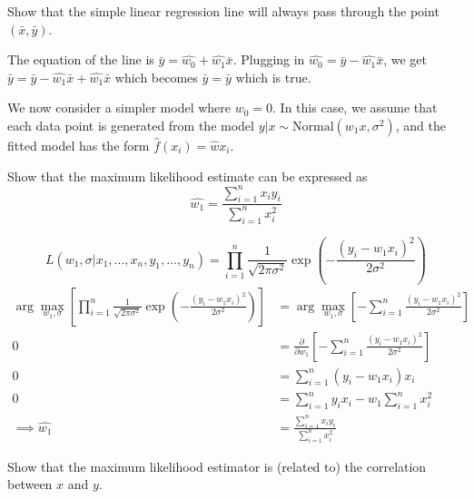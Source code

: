 \documentclass{article}
\begin{document}
\begin{probset}
\begin{prob}
\begin{subprobset}
    \begin{subprob}
        Show that the simple linear regression line will always pass through the point $(\bar{x}, \bar{y})$.

        \begin{soln}
            The equation of the line is $\bar{y} = \hat{w_0} + \hat{w_1} \bar{x}$. Plugging in $\hat{w_0} = \bar{y} - \hat{w_1} \bar{x}$, we get $\bar{y} = \bar{y} - \hat{w_1} \bar{x} + \hat{w_1} \bar{x}$ which becomes $\bar{y} = \bar{y}$ which is true.
        \end{soln}
    \end{subprob}

    \newpage

    We now consider a simpler model where $w_0 = 0$. In this case, we assume that each data point is generated from the model $y | x \sim \text{Normal}(w_1 x, \sigma^2)$, and the fitted model has the form $\hat{f} (x_i) = \hat{w} x_i$.

    \begin{subprob}
        Show that the maximum likelihood estimate can be expressed as 
        \[ \hat{w_1} = \frac{\sum_{i=1}^n x_i y_i}{\sum_{i=1}^n x_i^2} \]

        \begin{soln}
            \[ L(w_1,\sigma | x_1, \dots, x_n, y_1, \dots, y_n) = \prod_{i=1}^n \frac{1}{\sqrt{2\pi\sigma^2}} \exp\left(-\frac{(y_i - w_1 x_i)^2}{2\sigma^2}\right) \]
            \begin{align*}
                \arg\max_{w_1,\sigma} \left[ \prod_{i=1}^n \frac{1}{\sqrt{2\pi\sigma^2}} \exp\left(-\frac{(y_i - w_1 x_i)^2}{2\sigma^2}\right) \right] &= \arg\max_{w_1,\sigma} \left[ -\sum_{i=1}^n \frac{(y_i - w_1 x_i)^2}{2\sigma^2} \right] \\
                0 &= \frac{\partial}{\partial w_1} \left[ -\sum_{i=1}^n \frac{(y_i - w_1 x_i)^2}{2\sigma^2} \right] \\
                0 &= \sum_{i=1}^n (y_i - w_1 x_i) x_i \\
                0 &= \sum_{i=1}^n y_i x_i - w_1 \sum_{i=1}^n x_i^2 \\
                \implies \hat{w_1} &= \frac{\sum_{i=1}^n x_i y_i}{\sum_{i=1}^n x_i^2}
            \end{align*}
        \end{soln}
    \end{subprob}

    \begin{subprob}
        Show that the maximum likelihood estimator is (related to) the correlation between $x$ and $y$.


\end{subprob}
\end{subprobset}
\end{prob}
\end{probset}
\end{document}
